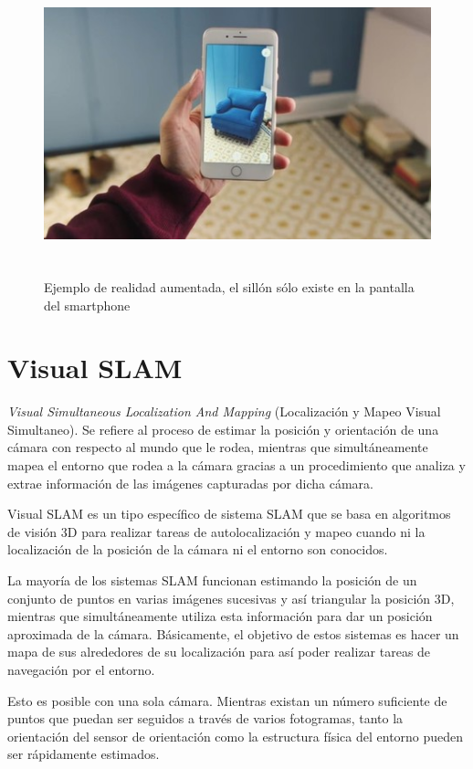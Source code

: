 \begin{figure}[htbp]
\begin{center}
\label{fig:realiadAumentada}\includegraphics[height=8.0cm]{img/cap2/realidadAumentada.jpg}
\end{center}
\caption{Ejemplo de realidad aumentada, el sillón sólo existe en la pantalla del smartphone}
\end{figure}


\section{Visual SLAM}

\textit{Visual Simultaneous Localization And Mapping} (Localización y Mapeo Visual Simultaneo). Se refiere al proceso de estimar la posición y orientación de una cámara con respecto al mundo que le rodea, mientras que simultáneamente mapea el entorno que rodea a la cámara gracias a un procedimiento que analiza y extrae información de las imágenes capturadas por dicha cámara.

Visual SLAM es un tipo específico de sistema SLAM que se basa en algoritmos de visión 3D
para realizar tareas de autolocalización y mapeo cuando ni la localización de la posición de la cámara ni el entorno son conocidos.

La mayoría de los sistemas SLAM funcionan estimando la posición de un conjunto de puntos en varias imágenes sucesivas y así triangular la posición 3D, mientras que simultáneamente utiliza esta información para dar un posición aproximada de la cámara. Básicamente, el objetivo de estos sistemas es hacer un mapa de sus alrededores de su localización para así poder realizar tareas de navegación por el entorno.

Esto es posible con una sola cámara. Mientras existan un número suficiente de puntos que puedan ser seguidos a través de varios fotogramas, tanto la orientación del sensor de orientación como la estructura física del entorno pueden ser rápidamente estimados.

